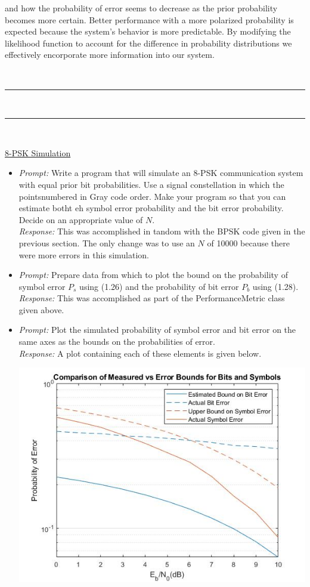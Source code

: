 \documentclass{article}
\newcommand{\problemsep}{\leavevmode\\[0.05in] \rule[\baselineskip/4]{\textwidth}{1pt} \\[0.005in] \rule[\baselineskip]{\textwidth}{1pt}\vspace{-\baselineskip}\leavevmode\\[0.05in]}
\begin{document}
\begin{enumerate}
and how the probability of error seems to decrease as the prior probability becomes more certain. Better performance with a more polarized probability is expected because the system's behavior is more predictable. By modifying the likelihood function to account for the difference in probability distributions we effectively encorporate more information into our system.  
\end{enumerate}
\problemsep
\pagebreak \begin{center} \vspace{-0.2in} \underline{8-PSK Simulation} \end{center}
\begin{itemize}
	\item {\it Prompt: }Write a program that will simulate an 8-PSK communication system with equal prior bit probabilities. Use a signal constellation in which the pointsnumbered in Gray code order. Make your program so that you can estimate botht eh symbol error probability and the bit error probability. Decide on an appropriate value of $N$. \\[0.05in]
				{\it Response: } This was accomplished in tandom with the BPSK code given in the previous section. The only change was to use an $N$ of 10000 because there were more errors in this simulation.
	\item {\it Prompt: } Prepare data from which to plot the bound on the probability of symbol error $P_s$ using (1.26) and the probability of bit error $P_b$ using (1.28). \\[0.05in]
				{\it Response: } This was accomplished as part of the PerformanceMetric class given above.
	\item {\it Prompt: }Plot the simulated probability of symbol error and bit error on the same axes as the bounds on the probabilities of error.\\[0.05in]
				{\it Response: } A plot containing each of these elements is given below.
\begin{center}\includegraphics[width=\textwidth]{8PSKProbabilityError.jpg}\end{center}

\end{itemize}
\end{document}
